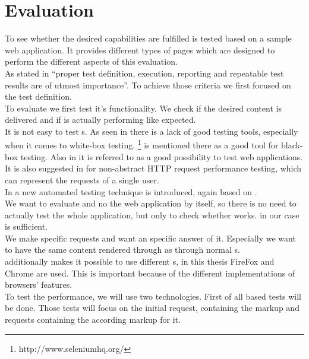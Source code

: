 \section{Evaluation}
To see whether the desired capabilities are fulfilled \lare{} is tested based on a sample web application.
It provides different types of pages which are designed to perform the different aspects of this evaluation.
\\
As stated in \cite{palomaki2010web} \enquote{proper test definition, execution, reporting and repeatable test results are of utmost importance}.
To achieve those criteria we first focused on the test definition.
\\
To evaluate \lare{} we first test it's functionality.
We check if the desired content is delivered and if \lare{} is actually performing like expected.
\\
It is not easy to test \ajax{} \webApplication{}s.
As seen in \cite{marchetto2007testing} there is a lack of good testing tools, especially when it comes to white-box testing.
\selenium{}\footnote{http://www.seleniumhq.org/} is mentioned there as a good tool for black-box testing.
Also in \cite{lundmarkautomatic} it is referred to as a good possibility to test web applications.
It is also suggested in \cite{palomaki2010web} for non-abstract HTTP request performance testing, which can represent the requests of a single user.
\\
In \cite{marchetto2008state} a new automated testing technique is introduced, again based on \selenium{}.
\\
We want to evaluate \lare{} and no the web application by itself, so there is no need to actually test the whole application, but only to check whether \lare{} works.
\selenium{} in our case is sufficient.
\\
We make specific requests and want an specific answer of it.
Especially we want to have the same content rendered through \lare{} as through normal \httpRequest{}s.
\\
\selenium{} additionally makes it possible to use different \webdriver{}s, in this thesis FireFox and Chrome are used.
This is important because of the different implementations of browsers' features.
\\
To test the performance, we will use two technologies.
\cite{bozdag2008performance}
First of all \curl{} based tests will be done.
Those tests will focus on the initial request, containing the markup and \lare{} requests containing the according markup for it.
\\
